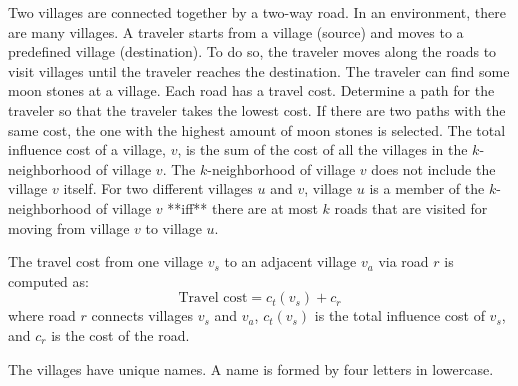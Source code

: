 Two villages are connected together by a two-way road. 
In an environment, there are many villages. 
A traveler starts from a village (source) and moves to a predefined village 
(destination). 
To do so, the traveler moves along the roads to visit villages until the 
traveler reaches the destination. 
The traveler can find some moon stones at a village. 
Each road has a travel cost. 
Determine a path for the traveler so that the traveler takes the lowest cost. 
If there are two paths with the same cost, 
the one with the highest amount of moon stones is selected.
The total influence cost of a village, $v$, 
is the sum of the cost of all the villages in the $k$-neighborhood of 
village $v$. The $k$-neighborhood of village $v$ does not include the 
village $v$ itself. 
For two different villages $u$ and $v$, village $u$ is a member of the 
$k$-neighborhood of village $v$ **iff** there are at most $k$ roads that are 
visited for moving from village $v$ to village $u$.

The travel cost from one village $v_s$ to an adjacent village $v_a$ 
via road $r$ is computed as:
$$\mbox{Travel cost} = c_t(v_s) + c_r$$
where road $r$ connects villages $v_s$ and $v_a$, 
$c_t(v_s)$ is the total influence cost of $v_s$, 
and $c_r$ is the cost of the road. 

The villages have unique names. 
A name is formed by four letters in lowercase.
